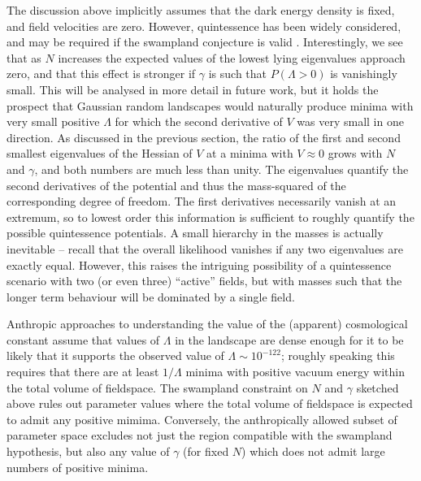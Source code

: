 \documentclass[12pt]{article}
\begin{document}
The discussion above implicitly assumes that the dark energy density is fixed, and field velocities are zero. However, quintessence \cite{Zlatev:1998tr,Tsujikawa2013} has been widely considered, and may be required if the swampland conjecture is valid \cite{Marsh:2018kub,Kinney:2018kew,Heisenberg:2018yae}. Interestingly, we see that as $N$ increases the expected values of the lowest lying eigenvalues approach zero, and that this effect is stronger if $\gamma$ is such that $P(\Lambda>0)$ is vanishingly small. This will be analysed in more detail in future work, but it holds the prospect that Gaussian random landscapes would naturally produce minima with very small positive $\Lambda$  for which the second derivative of $V$ was very small in one direction. As discussed in the previous section, the ratio of the first and second smallest eigenvalues of the Hessian of $V$ at a minima with $V\approx0$ grows with $N$ and $\gamma$, and both numbers are much less than unity. The eigenvalues quantify the second derivatives of the potential and thus the mass-squared of the corresponding degree of freedom. The first derivatives necessarily vanish at an extremum, so to lowest order this information is sufficient to roughly quantify the possible quintessence potentials.   A small hierarchy in the masses is actually inevitable -- recall that the overall likelihood vanishes if any two eigenvalues are exactly equal. However, this raises the intriguing possibility of a quintessence scenario with two (or even three) ``active'' fields, but with masses such that the longer term behaviour will be dominated by a single field.

Anthropic approaches to understanding the value of the (apparent) cosmological constant assume that values of $\Lambda$ in the landscape are  dense enough for it to be likely that it supports the observed value of $\Lambda \sim 10^{-122}$; roughly speaking this requires that there are at least $1/\Lambda$ minima with positive vacuum energy within the total volume of fieldspace. The swampland constraint on $N$ and $\gamma$ sketched above rules out parameter values where the total volume of fieldspace is expected to admit any positive mimima. Conversely, the anthropically allowed subset of parameter space excludes not just the region compatible with the swampland hypothesis, but also any value of $\gamma$ (for fixed $N$) which does not admit large  numbers of positive minima.
\end{document}

